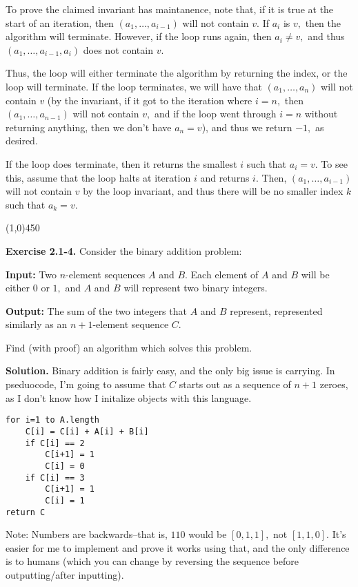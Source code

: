 \documentclass{article}
\newcommand{\exec}[2]
{\textbf{Exercise #1.} #2

\textbf{Solution.}}
\newcommand{\bardiv}{\begin{center}
\line(1,0){450}
\end{center}}
\begin{document}
To prove the claimed invariant has maintanence, note that, if it is true at the start of an iteration, then $(a_1, \dots, a_{i-1})$ will not contain $v.$ If $a_i$ is $v,$ then the algorithm will terminate. However, if the loop runs again, then $a_i \neq v,$ and thus $(a_1, \dots, a_{i-1}, a_i)$ does not contain $v.$

Thus, the loop will either terminate the algorithm by returning the index, or the loop will terminate. If the loop terminates, we will have that $(a_1, \dots, a_n)$ will not contain $v$ (by the invariant, if it got to the iteration where $i=n,$ then $(a_1, \dots, a_{n-1})$ will not contain $v,$ and if the loop went through $i=n$ without returning anything, then we don't have $a_n = v$), and thus we return $-1,$ as desired.

If the loop does terminate, then it returns the smallest $i$ such that $a_i = v.$ To see this, assume that the loop halts at iteration $i$ and returns $i.$ Then, $(a_1, \dots, a_{i-1})$ will not contain $v$ by the loop invariant, and thus there will be no smaller index $k$ such that $a_k = v.$ 

\bardiv

\exec{2.1-4}{Consider the binary addition problem:
\begin{tcolorbox}[title=Binary Addition Problem]
	\textbf{Input:} Two $n$-element sequences $A$ and $B.$ Each element of $A$ and $B$ will be either $0$ or $1,$ and $A$ and $B$ will represent two binary integers.

	\textbf{Output:} The sum of the two integers that $A$ and $B$ represent, represented similarly as an $n+1$-element sequence $C.$
\end{tcolorbox}

Find (with proof) an algorithm which solves this problem.}
Binary addition is fairly easy, and the only big issue is carrying. In pseduocode, I'm going to assume that $C$ starts out as a sequence of $n+1$ zeroes, as I don't know how I initalize objects with this language.

\begin{lstlisting}
for i=1 to A.length
	C[i] = C[i] + A[i] + B[i]
	if C[i] == 2
		C[i+1] = 1
		C[i] = 0
	if C[i] == 3
		C[i+1] = 1
		C[i] = 1
return C
\end{lstlisting}

Note: Numbers are backwards--that is, $110$ would be $[0, 1, 1],$ not $[1, 1, 0].$ It's easier for me to implement and prove it works using that, and the only difference is to humans (which you can change by reversing the sequence before outputting/after inputting).
\end{document}
